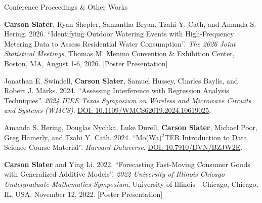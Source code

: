 \documentclass{resume} %
\newenvironment{pubentry}{\begin{list}{}{\setlength{\leftmargin}{1.5em}\setlength{\itemindent}{-1.5em}\setlength{\itemsep}{0pt}\setlength{\parsep}{0pt}\setlength{\topsep}{0pt}}\item[]}{\end{list}}
\begin{document}
\begin{rSection}{Conference Proceedings \& Other Works}
\begin{pubentry}\textbf{Carson Slater}, Ryan Shepler, Samantha Bryan, Tzahi Y. Cath, and Amanda S. Hering. 2026. ``Identifying Outdoor Watering Events with High-Frequency Metering Data to Assess Residential Water Consumption''. \textit{The 2026 Joint Statistical Meetings}, Thomas M. Menino Convention \& Exhibition Center, Boston, MA, August 1-6, 2026. [Poster Presentation]
\end{pubentry}

\vspace{0.25cm}

\begin{pubentry}Jonathan E. Swindell, \textbf{Carson Slater}, Samuel Hussey, Charles Baylis, and Robert J. Marks. 2024. ``Assessing Interference with Regression Analysis Techniques''. \textit{2024 IEEE Texas Symposium on Wireless and Microwave Circuits and Systems (WMCS)}. \href{https://doi.org/10.1109/WMCS62019.2024.10619025}{DOI: 10.1109/WMCS62019.2024.10619025}.
\end{pubentry}

\vspace{0.25cm}

\begin{pubentry}Amanda S. Hering, Douglas Nychka, Luke Durell, \textbf{Carson Slater}, Michael Poor, Greg Hamerly, and Tzahi Y. Cath. 2024. ``Mo(Wa)$^2$TER Introduction to Data Science Course Material''. \textit{Harvard Dataverse}. \href{https://doi.org/10.7910/DVN/BZJW2E}{DOI: 10.7910/DVN/BZJW2E}.
\end{pubentry}

\vspace{0.25cm}

\begin{pubentry}\textbf{Carson Slater} and Ying Li. 2022. ``Forecasting Fast-Moving Consumer Goods with Generalized Additive Models''. \textit{2022 University of Illinois Chicago Undergraduate Mathematics Symposium}, University of Illinois - Chicago, Chicago, IL, USA, November 12, 2022. [Poster Presentation]
\end{pubentry}

\end{rSection}
\end{document}

